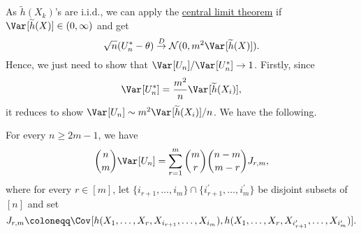 As \(\widetilde{h} (X_k)\)'s are i.i.d., we can apply the \hyperref[thm:CLT]{central limit theorem} if \(\Var_{}[\widetilde{h} (X)] \in (0, \infty )\) and get
\[
	\sqrt{n} (U_n^{\ast} - \theta ) \overset{D}{\to} \mathcal{N} (0, m^2 \Var_{}[\widetilde{h} (X)] ).
\]
Hence, we just need to show that \(\Var_{}[U_n] / \Var_{}[U_n^{\ast} ] \to 1\). Firstly, since
\[
	\Var_{}[U_n^{\ast} ]
	= \frac{m^2}{n} \Var_{}[\widetilde{h} (X_i)],
\]
it reduces to show \(\Var_{}[U_n] \sim m^2 \Var_{}[\widetilde{h} (X_i)] / n\). We have the following.

\begin{proposition}\label{prop:U-statistic-variance}
	For every \(n \geq 2m - 1\), we have
	\[
		\binom{n}{m} \Var_{}[U_n]
		= \sum_{r=1}^{m} \binom{m}{r} \binom{n-m}{m-r}J_{r, m},
	\]
	where for every \(r \in [m]\), let \(\{ i_{r+1} , \dots , i_m\} \cap \{ i_{r+1}^{\prime} , \dots , i_m^{\prime} \} \) be disjoint subsets of \([n]\) and set
	\[
		J_{r, m} \coloneqq \Cov_{}[h(X_1, \dots , X_r, X_{i_{r+1}}, \dots , X_{i_m}), h(X_1, \dots , X_r, X_{i^{\prime} _{r+1}}, \dots , X_{i_m^{\prime} })].
	\]
\end{proposition}
